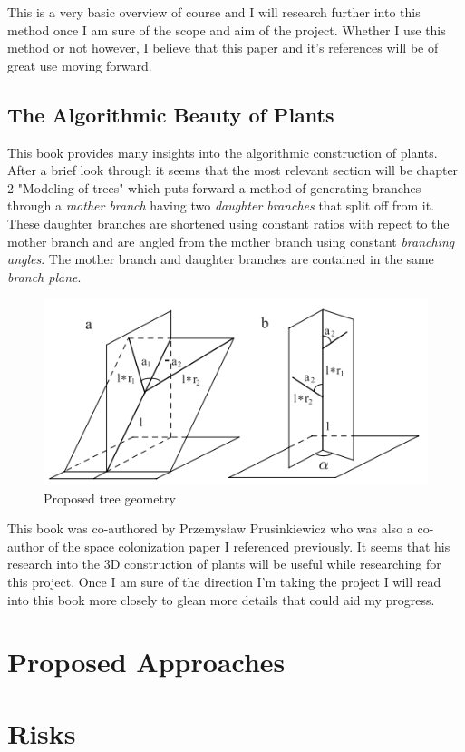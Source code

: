 \documentclass[proposal]{cmpreport}
\begin{document}
This is a very basic overview of course and I will research further into this method 
once I am sure of the scope and aim of the project. Whether I use this method or not 
however, I believe that this paper and it's references will be of great use moving 
forward.

\subsection{The Algorithmic Beauty of Plants}
This book \cite{beautyOfPlants} provides many insights into the algorithmic construction 
of plants. After a brief look through it seems that the most relevant section will be 
chapter 2 "Modeling of trees" which puts forward a method of generating branches through 
a \textit{mother branch} having two \textit{daughter branches} that split off from it. 
These daughter branches are shortened using constant ratios with repect to the mother 
branch and are angled from the mother branch using constant \textit{branching angles}. 
The mother branch and daughter branches are contained in the same \textit{branch plane}.

\begin{figure}[h]
        \caption{Proposed tree geometry}
        \includegraphics{MDbranches}
        \centering
\end{figure}

This book was co-authored by Przemysław Prusinkiewicz who was also a co-author of the 
space colonization paper I referenced previously. It seems that his research into 
the 3D construction of plants will be useful while researching for this project. 
Once I am sure of the direction I'm taking the project I will read into this book more 
closely to glean more details that could aid my progress.

\pagebreak
\section{Proposed Approaches}

\pagebreak
\section{Risks}

\pagebreak

\end{document}
